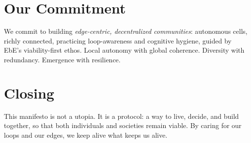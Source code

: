 \documentclass[11pt,a4paper]{article}
\begin{document}
\section*{Our Commitment}
We commit to building \emph{edge-centric, decentralized communities}: autonomous cells, richly connected, practicing loop-awareness and cognitive hygiene, guided by EbE’s viability-first ethos. Local autonomy with global coherence. Diversity with redundancy. Emergence with resilience.

\section*{Closing}
This manifesto is not a utopia. It is a protocol: a way to live, decide, and build together, so that both individuals and societies remain viable. By caring for our loops and our edges, we keep alive what keeps us alive.
\end{document}
